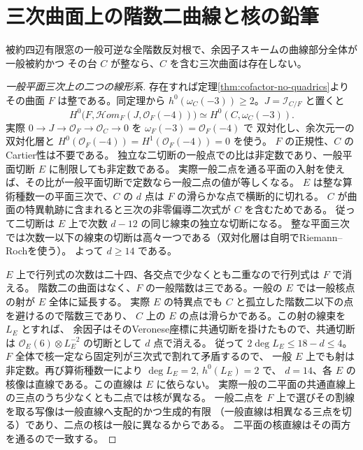 \section{三次曲面上の階数二曲線と核の鉛筆}
\label{sec:cofactor-cubic-surface}
\begin{theorem}\label{thm:cofactor-no-integral-cubic}
被約四辺有限窓の一般可逆な全階数反対根で、余因子スキームの曲線部分全体が一般被約かつ
その台 $C$ が整なら、$C$ を含む三次曲面は存在しない。
\end{theorem}
\begin{proof}[一般平面三次上の二つの線形系]
存在すれば定理\ref{thm:cofactor-no-quadrics}よりその曲面 $F$ は整である。同定理から
$h^0(\omega_C(-3))\ge2$。$J=\mathcal I_{C/F}$ と置くと
\[
 H^0\bigl(F,\mathcal Hom_F(J,\mathcal O_F(-4))\bigr)
                      \simeq H^0(C,\omega_C(-3)).
\]
実際 $0\to J\to\mathcal O_F\to\mathcal O_C\to0$ を $\omega_F(-3)=\mathcal O_F(-4)$ で
双対化し、余次元一の双対化層と $H^0(\mathcal O_F(-4))=H^1(\mathcal O_F(-4))=0$ を使う。
$F$ の正規性、$C$ のCartier性は不要である。
独立な二切断の一般点での比は非定数であり、一般平面切断 $E$ に制限しても非定数である。
実際一般二点を通る平面の入射を使えば、その比が一般平面切断で定数なら一般二点の値が等しくなる。
$E$ は整な算術種数一の平面三次で、$C$ の $d$ 点は $F$ の滑らかな点で横断的に切れる。
$C$ が曲面の特異軌跡に含まれると三次の非零偏導二次式が $C$ を含むためである。
従って二切断は $E$ 上で次数 $d-12$ の同じ線束の独立な切断になる。
整な平面三次では次数一以下の線束の切断は高々一つである（双対化層は自明でRiemann--Rochを使う）。
よって $d\ge14$ である。

$E$ 上で行列式の次数は二十四、各交点で少なくとも二重なので行列式は $F$ で消える。
階数二の曲面はなく、$F$ の一般階数は三である。一般の $E$ では一般核点の射が $E$ 全体に延長する。
実際 $E$ の特異点でも $C$ と孤立した階数二以下の点を避けるので階数三であり、
$C$ 上の $E$ の点は滑らかである。この射の線束を $L_E$ とすれば、
余因子はそのVeronese座標に共通切断を掛けたもので、共通切断は
$\mathcal O_E(6)\otimes L_E^{-2}$ の切断として $d$ 点で消える。
従って $2\deg L_E\le18-d\le4$。$F$ 全体で核一定なら固定列が三次式で割れて矛盾するので、
一般 $E$ 上でも射は非定数。再び算術種数一により $\deg L_E=2$, $h^0(L_E)=2$ で、
$d=14$、各 $E$ の核像は直線である。この直線は $E$ に依らない。
実際一般の二平面の共通直線上の三点のうち少なくとも二点では核が異なる。
一般二点を $F$ 上で選びその割線を取る写像は一般直線へ支配的かつ生成的有限
（一般直線は相異なる三点を切る）であり、二点の核は一般に異なるからである。
二平面の核直線はその両方を通るので一致する。
\end{proof}

